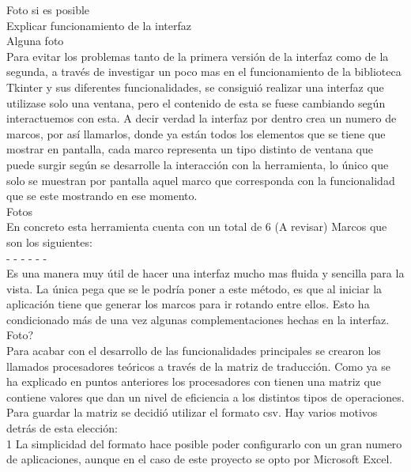 Foto si es posible\\

Explicar funcionamiento de la interfaz\\

Alguna foto\\

Para evitar los problemas tanto de la primera  versión de la interfaz como de la segunda, a través de investigar un poco mas en el funcionamiento  de la biblioteca Tkinter y sus diferentes funcionalidades, se consiguió realizar una interfaz que utilizase solo  una ventana, pero  el contenido  de esta se  fuese cambiando según interactuemos con esta. A decir verdad la interfaz por dentro crea un numero de  marcos, por así llamarlos, donde ya están todos los elementos que se tiene que mostrar en pantalla, cada marco representa un tipo distinto de ventana que puede surgir según se desarrolle la interacción con la herramienta, lo único que solo se muestran por pantalla aquel marco que corresponda con la funcionalidad que se este mostrando en ese momento.\\

Fotos\\

En concreto esta herramienta cuenta con un total de 6 (A revisar) Marcos que son los siguientes:\\
-
-
-
-
-
-\\

Es una manera muy útil de hacer una interfaz mucho mas fluida y sencilla para la vista. La única pega que se le podría poner a este método, es que al iniciar la aplicación tiene que generar los marcos para ir rotando entre ellos. Esto ha condicionado más de una vez algunas complementaciones hechas en la interfaz.\\
Foto?\\

Para acabar con el desarrollo de las funcionalidades principales se crearon los llamados procesadores teóricos a través de la matriz de traducción. Como ya se ha explicado en puntos anteriores los procesadores con tienen una matriz que contiene valores que dan un nivel de eficiencia a los distintos tipos de operaciones. Para guardar la matriz se decidió utilizar el formato csv. Hay varios motivos detrás de esta elección:\\

1 La simplicidad del formato hace posible poder configurarlo con un gran numero de aplicaciones, aunque en el caso de este proyecto se opto por Microsoft Excel.\\

